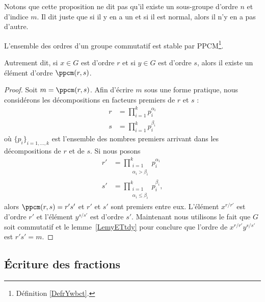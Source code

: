 \begin{normaltext}
	Notons que cette proposition ne dit pas qu'il existe un sous-groupe d'ordre \( n\) et d'indice \( m\). Il dit juste que si il y en a un et si il est normal, alors il n'y en a pas d'autre.
\end{normaltext}

\begin{lemma}       \label{LemqAUBYn}
	L'ensemble des ordres d'un groupe commutatif est stable par PPCM\footnote{Définition \ref{DefrYwbct}.}.

	Autrement dit, si \( x\in G\) est d'ordre \( r\) et si \( y\in G\) est d'ordre \( s\), alors il existe un élément d'ordre \( \ppcm(r,s)\).
\end{lemma}

\begin{proof}
	Soit \( m=\ppcm(r,s)\). Afin d'écrire \( m\) sous une forme pratique, nous considérons les décompositions en facteurs premiers de \( r\) et \( s\) :
	\begin{subequations}
		\begin{align}
			r & =\prod_{i=1}^kp_i^{\alpha_i} \\
			s & =\prod_{i=1}^kp_i^{\beta_i}
		\end{align}
	\end{subequations}
	où \( \{ p_i \}_{i=1,\ldots, k}\) est l'ensemble des nombres premiers arrivant dans les décompositions de \( r\) et de \( s\). Si nous posons
	\begin{subequations}
		\begin{align}
			r' & =\prod_{\substack{i=1 \\\alpha_i>\beta_i}}^kp_i^{\alpha_i}      \\
			s' & =\prod_{\substack{i=1 \\\alpha_i\leq \beta_i}}^kp_i^{\beta_i},
		\end{align}
	\end{subequations}
	alors \( \ppcm(r,s)=r's'\) et \( r'\) et \( s'\) sont premiers entre eux. L'élément \( x^{r/r'}\) est d'ordre \( r'\) et l'élément \( y^{s/s'}\) est d'ordre \( s'\). Maintenant nous utilisons le fait que \( G\) soit commutatif et le lemme~\ref{LemyETtdy} pour conclure que l'ordre de \( x^{r/r'}y^{s/s'}\) est \( r's'=m\).
\end{proof}

\subsection{Écriture des fractions}

